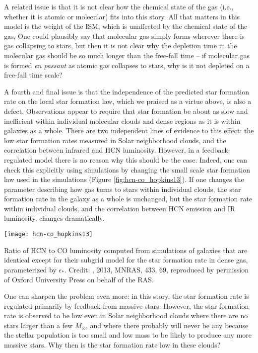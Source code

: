 A related issue is that it is not clear how the chemical state of the gas (i.e., whether it is atomic or molecular) fits into this story. All that matters in this model is the weight of the ISM, which is unaffected by the chemical state of the gas, One could plausibly say that molecular gas simply forms wherever there is gas collapsing to stars, but then it is not clear why the depletion time in the molecular gas should be so much longer than the free-fall time -- if molecular gas is formed \textit{en passant} as atomic gas collapses to stars, why is it not depleted on a free-fall time scale?

A fourth and final issue is that the independence of the predicted star formation rate on the local star formation law, which we praised as a virtue above, is also a defect. Observations appear to require that star formation be about as slow and inefficient within individual molecular clouds and dense regions as it is within galaxies as a whole. There are two independent lines of evidence to this effect: the low star formation rates measured in Solar neighborhood clouds, and the correlation between infrared and HCN luminosity. However, in a feedback-regulated model there is no reason why this should be the case. Indeed, one can check this explicitly using simulations by changing the small scale star formation law used in the simulations (Figure \ref{fig:hcn-co_hopkins13}). If one changes the parameter describing how gas turns to stars within individual clouds, the star formation rate in the galaxy as a whole is unchanged, but the star formation rate within individual clouds, and the correlation between HCN emission and IR luminosity, changes dramatically.

\begin{marginfigure}
\texttt{[image: hcn-co\_hopkins13]}
\caption[Ratio of HCN to CO luminosity as a function of subgrid star formation recipe]{
\label{fig:hcn-co_hopkins13}
Ratio of HCN to CO luminosity computed from simulations of galaxies that are identical except for their subgrid model for the star formation rate in dense gas, parameterized by $\epsilon_*$. Credit: \citeauthor{hopkins13c}, 2013, MNRAS, 433, 69, reproduced by permission of Oxford University Press on behalf of the RAS.
}
\end{marginfigure}

One can sharpen the problem even more: in this story, the star formation rate is regulated primarily by feedback from massive stars. However, the star formation rate is observed to be low even in Solar neighborhood clouds where there are no stars larger than a few $M_\odot$, and where there probably will never be any because the stellar population is too small and low mass to be likely to produce any more massive stars. Why then is the star formation rate low in these clouds?

